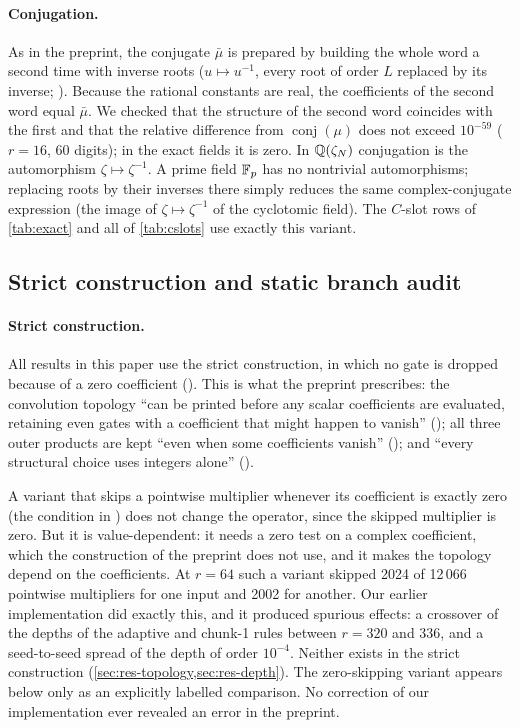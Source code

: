 \documentclass[11pt]{article}
\theoremstyle{plain}
\begin{document}
\paragraph{Conjugation.}
As in the preprint, the conjugate $\bar\mu$ is prepared by building the whole word a second time with inverse roots ($u\mapsto u^{-1}$, every root of order $L$ replaced by its inverse; ). Because the rational constants are real, the coefficients of the second word equal $\bar\mu$. We checked that the structure of the second word coincides with the first and that the relative difference from $\operatorname{conj}(\mu)$ does not exceed $10^{-59}$ ($r=16$, 60 digits); in the exact fields it is zero. In $\mathbb{Q}(\zeta_N)$ conjugation is the automorphism $\zeta\mapsto\zeta^{-1}$. A prime field $\mathbb{F}_p$ has no nontrivial automorphisms; replacing roots by their inverses there simply reduces the same complex-conjugate expression (the image of $\zeta\mapsto\zeta^{-1}$ of the cyclotomic field). The $C$-slot rows of \cref{tab:exact} and all of \cref{tab:cslots} use exactly this variant.

\subsection{Strict construction and static branch audit}\label{sec:strict}
\paragraph{Strict construction.}
All results in this paper use the strict construction, in which no gate is dropped because of a zero coefficient (). This is what the preprint prescribes: the convolution topology ``can be printed before any scalar coefficients are evaluated, retaining even gates with a coefficient that might happen to vanish'' (); all three outer products are kept ``even when some coefficients vanish'' (); and ``every structural choice uses integers alone'' ().

A variant that skips a pointwise multiplier whenever its coefficient is exactly zero (the condition  in ) does not change the operator, since the skipped multiplier is zero. But it is value-dependent: it needs a zero test on a complex coefficient, which the construction of the preprint does not use, and it makes the topology depend on the coefficients. At $r=64$ such a variant skipped 2024 of 12\,066 pointwise multipliers for one input and 2002 for another. Our earlier implementation did exactly this, and it produced spurious effects: a crossover of the depths of the adaptive and chunk-1 rules between $r=320$ and $336$, and a seed-to-seed spread of the depth of order $10^{-4}$. Neither exists in the strict construction (\cref{sec:res-topology,sec:res-depth}). The zero-skipping variant appears below only as an explicitly labelled comparison. No correction of our implementation ever revealed an error in the preprint.
\end{document}
